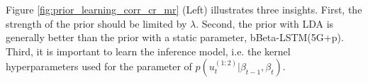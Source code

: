 \documentclass[letterpaper]{article} %
\begin{document}
Figure \ref{fig:prior_learning_corr_cr_mr} (Left) illustrates three insights. First, the strength of the prior should be limited by $\lambda$. Second, the prior with LDA is generally better than the prior with a static parameter, bBeta-LSTM(5G+p). Third, it is important to learn the inference model, i.e. the kernel hyperparameters used for the parameter of $p(u_{t}^{(1:2)}|\beta_{t-1},\beta_{t})$. 

%
\end{document}
